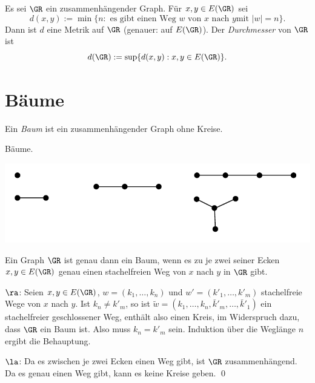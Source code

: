 \DB Es sei $\GR$ ein zusammenhängender Graph. Für $x,y\in E(\GR)$ sei
\[
d(x,y) := \min\{ n : \text{ es gibt einen Weg $w$ von $x$ nach $y$
	mit $|w|=n$} \}.
\]
Dann ist $d$ eine Metrik auf $\GR$ (genauer: auf $E(\GR)$).
Der \emph{Durchmesser} von $\GR$ ist
\[
d(\GR) := \sup\{ d(x,y) : x,y\in E(\GR)\}.
\]

\section{Bäume}\label{sec_baum}

\DEF Ein \emph{Baum} ist ein
zusammenhängender Graph ohne Kreise.

\BSP Bäume.
\begin{center}
	\includegraphics{grugraImages/bspbaum}
\end{center}

\PROP Ein Graph $\GR$ ist genau dann ein Baum, wenn es zu je zwei
seiner Ecken $x,y\in E(\GR)$ genau einen stachelfreien Weg von $x$ nach $y$ in
$\GR$ gibt.

\bew \glqq$\ra$\grqq: Seien $x,y\in E(\GR)$,
$w=(k_1,\ldots,k_n)$ und $w'=(k'_1,\ldots,k'_m)$ stachelfreie Wege
von $x$ nach $y$. Ist $k_n\neq k'_m$, so ist
$\tilde{w}=(k_1,\ldots,k_n,\bar{k}'_m,\ldots,\bar{k}'_1)$
ein stachelfreier geschlossener Weg, enthält also einen
Kreis, im Widerspruch dazu, dass $\GR$ ein Baum ist.
Also muss $k_n=k'_m$ sein. Induktion über die Weglänge $n$ ergibt
die Behauptung.

\glqq $\la$\grqq: Da es zwischen je zwei Ecken einen Weg gibt, ist
$\GR$ zusammenhängend. Da es genau einen Weg gibt, kann es keine
Kreise geben.
\qed

